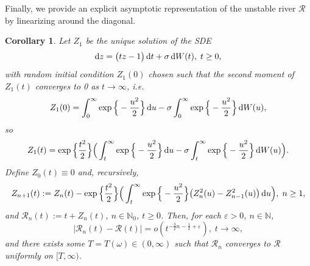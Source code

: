 \documentclass[sn-mathphys-num]{sn-jnl}
\newtheorem{cor}[thm]{Corollary}
\theoremstyle{definition}
\newcommand{\scr}[1]{\mathscr #1}
\numberwithin{equation}{section} \theoremstyle{remark}
\renewcommand{\d}{\hbox{d}}
\def\N{\mathbb N} \def\kk{\kappa} \def\m{{\bf m}}
\def\d{\text{\rm{d}}} \def\bb{\beta} \def\aa{\alpha} \def\D{\scr D}
\def\RR{\mathscr R}
\newcommand{\1}{\mathbbm{1}}
\begin{document}
   Finally, we provide an explicit asymptotic representation of the unstable river $\scr{R}$ by linearizing around the diagonal.

   \begin{cor}\label{Rbar}
Let $Z_1$ be the unique solution of the SDE
     $$
\d z= \big(tz-1\big)\,\d t+\sigma\,\d W(t),\;t \geq 0,
$$
with random initial condition $Z_1(0)$ chosen such that the second moment of $Z_1(t)$ converges to 0 as $t\to \infty$,
i.e.
$$
Z_1(0)=\int_0^\infty \exp\Big\{ -\frac{u^2}2        \Big\}\,\d u -\sigma \int_0^\infty\exp\Big\{-\frac{u^2}2 \Big\}\,\d W(u), 
$$
so
$$
Z_1(t)=\exp\Big\{\frac{t^2}2 \Big\}\Big(\int_t^\infty\exp\Big\{-\frac{u^2}2 \Big\}\,\d u     -\sigma  \int_t^\infty\exp\Big\{-\frac{u^2}2 \Big\}\,\d W(u)\Big).
$$
Define $Z_0(t)\equiv 0$ and, recursively,
$$
Z_{n+1}(t):=Z_n(t)- \exp\Big\{\frac{t^2}2 \Big\}\Big(\int_t^\infty\exp\Big\{-\frac{u^2}2 \Big\}\big(Z_n^2(u)-Z_{n-1}^2(u)\big)\,\d u\Big)      ,\; n\geq 1,
$$
and $\RR_n(t):=t+Z_n(t)$, $n \in \N_0$, $t\geq 0$. Then, for each $\varepsilon>0$, $n \in \N$,
\begin{equation}\label{star}
\big|\RR_n(t)-\RR(t)\big|=o(t^{-\frac 32 n -\frac 12 +\varepsilon}),\;t \to \infty,
\end{equation}
and there exists some $T=T(\omega)\in (0,\infty)$    such that $\RR_n$ converges to $\RR$ uniformly on $[T,\infty)$.
%
\end{cor}
\end{document}
